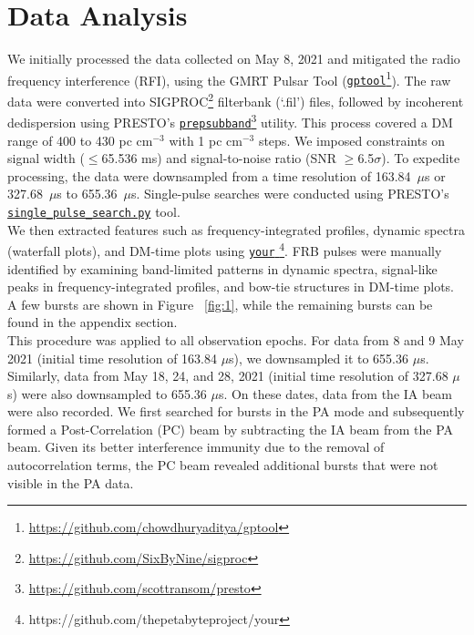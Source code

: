 \documentclass[preprint2, trackchanges]{aastex631}
\begin{document}
\section{Data Analysis}
We initially processed the data collected on May 8, 2021 and mitigated the radio frequency interference (RFI), using the GMRT Pulsar Tool (\href{https://github.com/chowdhuryaditya/gptool} {\texttt{gptool}}\footnote{\url{https://github.com/chowdhuryaditya/gptool}}). The raw data were converted into SIGPROC\footnote{{\url{https://github.com/SixByNine/sigproc}}} filterbank (`.fil') files, followed by incoherent dedispersion using PRESTO's \href{https://github.com/scottransom/presto/blob/master/src/prepsubband.c}{\texttt{prepsubband}}\footnote{\label{presto-footnote}\url{https://github.com/scottransom/presto}} utility. This process covered a DM range of 400 to 430 pc cm$^{-3}$ with 1 pc cm$^{-3}$ steps. We imposed constraints on signal width ($\leq$65.536 ms) and signal-to-noise ratio (SNR $\geq$6.5$\sigma$). To expedite processing, the data were downsampled from a time resolution of 163.84~$\mu$s or 327.68~$\mu$s to 655.36~$\mu$s. Single-pulse searches were conducted using PRESTO's \href{https://github.com/scottransom/presto/blob/master/bin/single_pulse_search.py}{\texttt{single\_pulse\_search.py}} tool.
\\
We then extracted features such as frequency-integrated profiles, dynamic spectra (waterfall plots), and DM-time plots using \href{https://github.com/thepetabyteproject/your}{\texttt{your} \footnote{\label{your}\url{https://github.com/thepetabyteproject/your}}}. FRB pulses were manually identified by examining band-limited patterns in dynamic spectra, signal-like peaks in frequency-integrated profiles, and bow-tie structures in DM-time plots. A few bursts are shown in Figure ~\ref{fig:1}, while the remaining bursts can be found in the appendix section.
\\
This procedure was applied to all observation epochs. For data from 8 and 9 May 2021 (initial time resolution of 163.84 $\mu$s), we downsampled it to 655.36 $\mu$s. Similarly, data from May 18, 24, and 28, 2021 (initial time resolution of 327.68 $\mu$s) were also downsampled to 655.36 $\mu$s. On these dates, data from the IA beam were also recorded. We first searched for bursts in the PA mode and subsequently formed a Post-Correlation (PC) beam \citep{2018ApJ...864..160R} by subtracting the IA beam from the PA beam. Given its better interference immunity due to the removal of autocorrelation terms, the PC beam revealed additional bursts that were not visible in the PA data.
\end{document}
